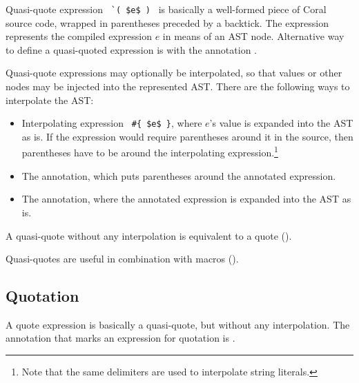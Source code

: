Quasi-quote expression ~\lstinline!`( $e$ )!~ is basically a well-formed piece of Coral source code, wrapped in parentheses preceded by a backtick. The expression represents the compiled expression $e$ in means of an AST node. Alternative way to define a quasi-quoted expression is with the annotation .

Quasi-quote expressions may optionally be interpolated, so that values or other nodes may be injected into the represented AST. There are the following ways to interpolate the AST:
\begin{itemize}
\item Interpolating expression ~\lstinline!#{ $e$ }!, where $e$'s value is expanded into the AST as is. If the expression would require parentheses around it in the source, then parentheses have to be around the interpolating expression.\footnote{Note that the same delimiters are used to interpolate string literals.}
\item The  annotation, which puts parentheses around the annotated expression. 
\item The  annotation, where the annotated expression is expanded into the AST as is. 
\end{itemize}

A quasi-quote without any interpolation is equivalent to a quote (). 

Quasi-quotes are useful in combination with macros (). 






\subsection{Quotation}
\label{sec:quotation}

A quote expression is basically a quasi-quote, but without any interpolation. The annotation that marks an expression for quotation is . 
















